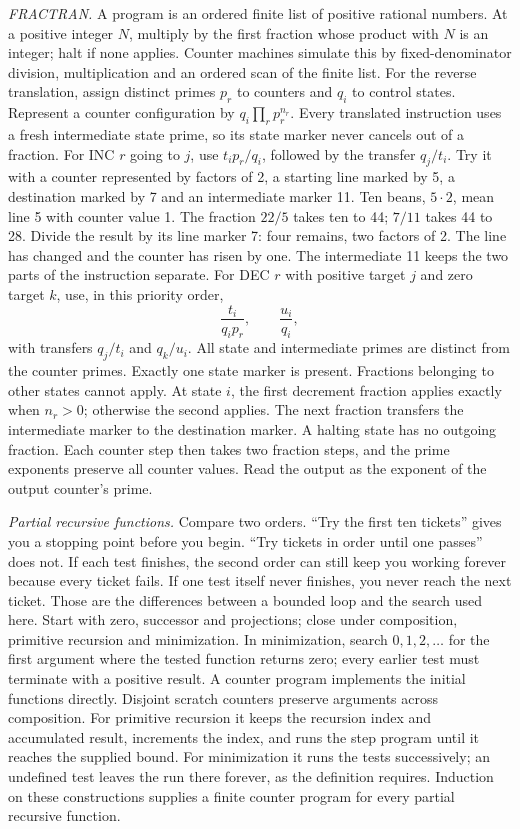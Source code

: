 \documentclass[11pt,twoside]{article}
\theoremstyle{thielethm}
\theoremstyle{thieledef}
\theoremstyle{thieledef}
\theoremstyle{thieledef}
\theoremstyle{thielethm}
\theoremstyle{thieleobs}
\theoremstyle{thielethm}
\begin{document}
\emph{FRACTRAN.} A program is an ordered finite list of positive rational numbers.
At a positive integer $N$, multiply by the first fraction whose product with $N$ is
an integer; halt if none applies. Counter machines simulate this by fixed-denominator
division, multiplication and an ordered scan of the finite list.
For the reverse translation, assign distinct primes $p_r$ to counters and $q_i$ to
control states. Represent a counter configuration by
$q_i\prod_r p_r^{n_r}$. Every translated instruction uses a fresh intermediate state
prime, so its state marker never cancels out of a fraction.
For INC $r$ going to $j$, use
$t_i p_r/q_i$, followed by the transfer $q_j/t_i$.
Try it with a counter represented by factors of 2, a starting line marked by 5,
a destination marked by 7 and an intermediate marker 11. Ten beans, $5\cdot2$,
mean line 5 with counter value 1. The fraction $22/5$ takes ten to 44; $7/11$
takes 44 to 28. Divide the result by its line marker 7: four remains, two factors
of 2. The line has changed and the counter has risen by one. The intermediate 11
keeps the two parts of the instruction separate.
For DEC $r$ with positive target $j$ and zero target $k$, use, in this priority order,
\[
\frac{t_i}{q_i p_r},\qquad \frac{u_i}{q_i},
\]
with transfers $q_j/t_i$ and $q_k/u_i$. All state and intermediate primes are distinct
from the counter primes. Exactly one state marker is present. Fractions belonging
to other states cannot apply. At state $i$, the first decrement fraction applies exactly
when $n_r>0$; otherwise the second applies. The next fraction transfers the intermediate
marker to the destination marker. A halting state has no outgoing fraction. Each
counter step then takes two fraction steps, and the prime exponents preserve all
counter values. Read the output as the exponent of the output counter's prime.

\emph{Partial recursive functions.} Compare two orders. ``Try the first ten tickets''
gives you a stopping point before you begin. ``Try tickets in order until one
passes'' does not. If each test finishes, the second order can still keep you
working forever because every ticket fails. If one test itself never finishes,
you never reach the next ticket. Those are the differences between a bounded
loop and the search used here.
Start with zero, successor and projections;
close under composition, primitive recursion and minimization. In minimization,
search $0,1,2,\ldots$ for the first argument where the tested function returns zero;
every earlier test must terminate with a positive result. A counter program implements
the initial functions directly. Disjoint scratch counters preserve arguments across
composition. For primitive recursion it keeps the recursion index and accumulated result,
increments the index, and runs the step program until it reaches the supplied bound.
For minimization it runs the tests successively; an undefined test leaves the run there
forever, as the definition requires. Induction on these constructions supplies a finite
counter program for every partial recursive function.
\end{document}
